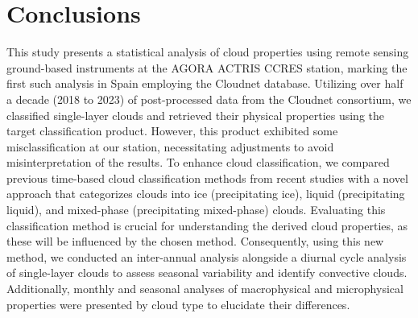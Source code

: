 \section{Conclusions}\label{sec:conlusion}

This study presents a statistical analysis of cloud properties using remote sensing ground-based instruments at the AGORA ACTRIS CCRES station, marking the first such analysis in Spain employing the Cloudnet database. Utilizing over half a decade (2018 to 2023) of post-processed data from the Cloudnet consortium, we classified single-layer clouds and retrieved their physical properties using the target classification product. However, this product exhibited some misclassification at our station, necessitating adjustments to avoid misinterpretation of the results. To enhance cloud classification, we compared previous time-based cloud classification methods from recent studies with a novel approach that categorizes clouds into ice (precipitating ice), liquid (precipitating liquid), and mixed-phase (precipitating mixed-phase) clouds. Evaluating this classification method is crucial for understanding the derived cloud properties, as these will be influenced by the chosen method. Consequently, using this new method, we conducted an inter-annual analysis alongside a diurnal cycle analysis of single-layer clouds to assess seasonal variability and identify convective clouds. Additionally, monthly and seasonal analyses of macrophysical and microphysical properties were presented by cloud type to elucidate their differences.

